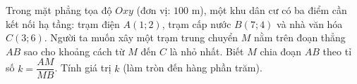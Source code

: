 \begin{bt}%
	Trong mặt phẳng tọa độ $Oxy$ (đơn vị: $100$ m), một khu dân cư có ba điểm cần kết nối hạ tầng: trạm điện $A(1;2)$, trạm cấp nước $B(7;4)$ và nhà văn hóa $C(3;6)$. Người ta muốn xây một trạm trung chuyển $M$ nằm trên đoạn thẳng $AB$ sao cho khoảng cách từ $M$ đến $C$ là nhỏ nhất. Biết $M$ chia đoạn $AB$ theo tỉ số $k=\dfrac{AM}{MB}$. Tính giá trị $k$ (làm tròn đến hàng phần trăm).
	
\end{bt}

